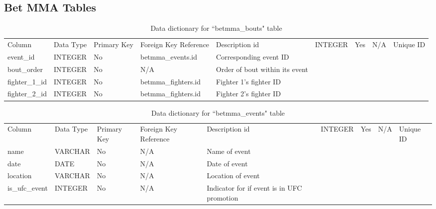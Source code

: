 \documentclass[12pt,twoside]{report}
\begin{document}
\subsection{Bet MMA Tables}

\tiny
\begin{longtable}{lllll}
\caption{Data dictionary for ``betmma\_bouts" table}\\ 
\toprule
Column         & Data Type & Primary Key & Foreign Key Reference & Description                     \endfirsthead 
\toprule
id             & INTEGER   & Yes         & N/A                   & Unique ID                       \\
event\_id      & INTEGER   & No          & betmma\_events.id     & Corresponding event ID          \\
bout\_order    & INTEGER   & No          & N/A                   & Order of bout within its event  \\
fighter\_1\_id & INTEGER   & No          & betmma\_fighters.id   & Fighter 1's fighter ID          \\
fighter\_2\_id & INTEGER   & No          & betmma\_fighters.id   & Fighter 2's fighter ID          \\
\bottomrule
\end{longtable}
\normalsize


\tiny
\begin{longtable}{lllll}
\caption{Data dictionary for ``betmma\_events" table}\\ 
\toprule
Column         & Data Type & Primary Key & Foreign Key Reference & Description                                 \endfirsthead 
\toprule
id             & INTEGER   & Yes         & N/A                   & Unique ID                                   \\
name           & VARCHAR   & No          & N/A                   & Name of event                               \\
date           & DATE      & No          & N/A                   & Date of event                               \\
location       & VARCHAR   & No          & N/A                   & Location of event                           \\
is\_ufc\_event & INTEGER   & No          & N/A                   & Indicator for if event is in UFC promotion  \\
\bottomrule
\end{longtable}
\normalsize
\end{document}
